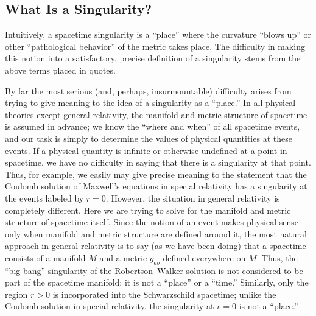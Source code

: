 
\subsection{What Is a Singularity?}\label{sec:9.1}

Intuitively, a spacetime singularity is a ``place'' where the curvature ``blows up'' or
other ``pathological behavior'' of the metric takes place. The difficulty in making this
notion into a satisfactory, precise definition of a singularity stems from the above
terms placed in quotes.

By far the most serious (and, perhaps, insurmountable) difficulty arises from
trying to give meaning to the idea of a singularity as a ``place.'' In all physical theories
except general relativity, the manifold and metric structure of spacetime is assumed
in advance; we know the ``where and when'' of all spacetime events, and our task is
simply to determine the values of physical quantities at these events. If a physical
quantity is infinite or otherwise undefined at a point in spacetime, we have no
difficulty in saying that there is a singularity at that point. Thus, for example, we
easily may give precise meaning to the statement that the Coulomb solution of
Maxwell's equations in special relativity has a singularity at the events labeled by
\(r=0\). However, the situation in general relativity is completely different. Here we
are trying to solve for the manifold and metric structure of spacetime itself. Since the
notion of an event makes physical sense only when manifold and metric structure are
defined around it, the most natural approach in general relativity is to say (as we have
been doing) that a spacetime consists of a manifold \(M\) and a metric \(g_{ab}\) defined
everywhere on \(M\). Thus, the ``big bang'' singularity of the Robertson--Walker solution
is not considered to be part of the spacetime manifold; it is not a ``place'' or a ``time.''
Similarly, only the region \(r>0\) is incorporated into the Schwarzschild spacetime;
unlike the Coulomb solution in special relativity, the singularity at \(r=0\) is not a
``place.''


